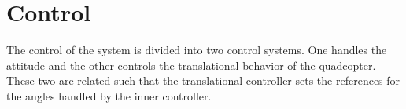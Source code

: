 \section{Control}\label{sec:control}
The control of the system is divided into two control systems. One handles the attitude and the other controls the translational behavior of the quadcopter. These two are related such that the translational controller sets the references for the angles handled by the inner controller.